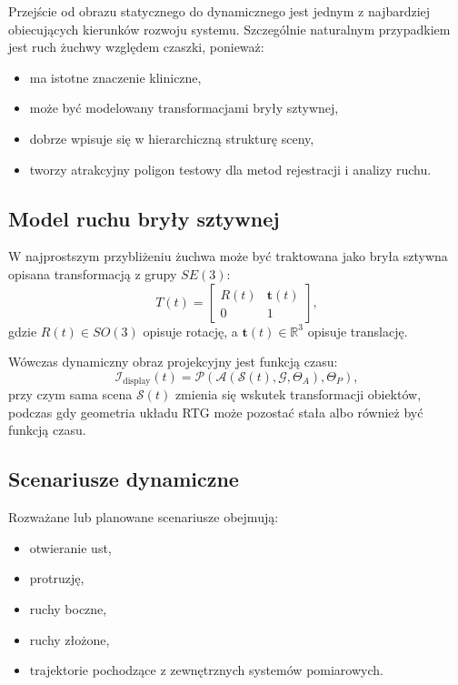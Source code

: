 \documentclass[11pt,a4paper]{article}
\begin{document}
Przejście od obrazu statycznego do dynamicznego jest jednym z najbardziej obiecujących
kierunków rozwoju systemu. Szczególnie naturalnym przypadkiem jest ruch żuchwy względem
czaszki, ponieważ:
\begin{itemize}
\item ma istotne znaczenie kliniczne,
\item może być modelowany transformacjami bryły sztywnej,
\item dobrze wpisuje się w hierarchiczną strukturę sceny,
\item tworzy atrakcyjny poligon testowy dla metod rejestracji i analizy ruchu.
\end{itemize}

\subsection{Model ruchu bryły sztywnej}

W najprostszym przybliżeniu żuchwa może być traktowana jako bryła sztywna
opisana transformacją z grupy \(SE(3)\):
\[
T(t)=
\begin{bmatrix}
R(t) & \mathbf{t}(t)\\
0 & 1
\end{bmatrix},
\]
gdzie \(R(t)\in SO(3)\) opisuje rotację, a \(\mathbf{t}(t)\in\mathbb{R}^3\)
opisuje translację.

Wówczas dynamiczny obraz projekcyjny jest funkcją czasu:
\[
  \mathcal{I}_{\mathrm{display}}(t)=
  \mathcal{P}\!\left(
    \mathcal{A}\!\left(
      \mathcal{S}(t),\mathcal{G},\Theta_A
    \right),
    \Theta_P
  \right),
\]
przy czym sama scena \(\mathcal{S}(t)\) zmienia się wskutek transformacji obiektów,
podczas gdy geometria układu RTG może pozostać stała albo również być funkcją czasu.

\subsection{Scenariusze dynamiczne}

Rozważane lub planowane scenariusze obejmują:
\begin{itemize}
\item otwieranie ust,
\item protruzję,
\item ruchy boczne,
\item ruchy złożone,
\item trajektorie pochodzące z zewnętrznych systemów pomiarowych.
\end{itemize}
\end{document}

